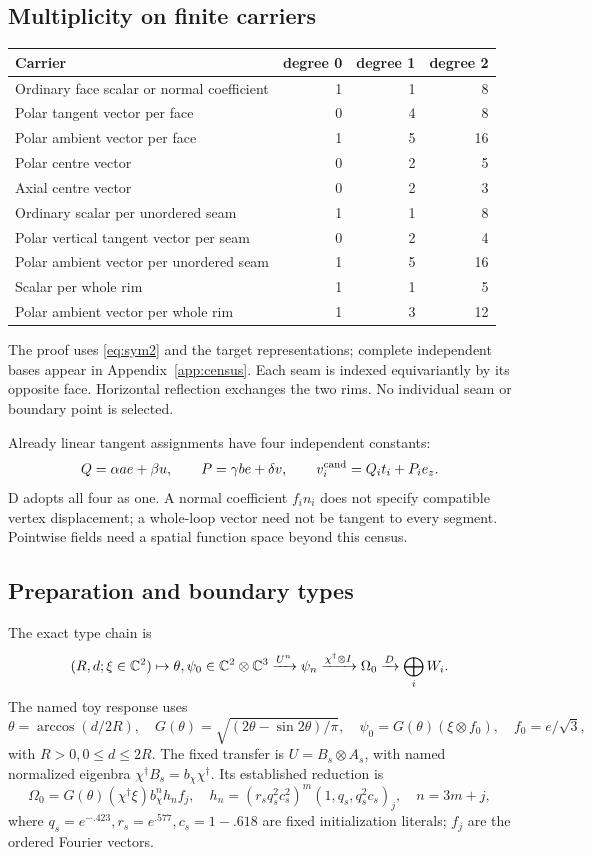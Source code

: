 \subsection{Multiplicity on finite carriers}
\begin{center}\small
\begin{tabular}{lrrr}\toprule
Carrier & degree 0 & degree 1 & degree 2\\\midrule
Ordinary face scalar or normal coefficient &1&1&8\\
Polar tangent vector per face &0&4&8\\
Polar ambient vector per face &1&5&16\\
Polar centre vector &0&2&5\\
Axial centre vector &0&2&3\\
Ordinary scalar per unordered seam &1&1&8\\
Polar vertical tangent vector per seam &0&2&4\\
Polar ambient vector per unordered seam &1&5&16\\
Scalar per whole rim &1&1&5\\
Polar ambient vector per whole rim &1&3&12\\\bottomrule
\end{tabular}
\end{center}
The proof uses \eqref{eq:sym2} and the target representations; complete independent bases appear in Appendix~\ref{app:census}. Each seam is indexed equivariantly by its opposite face. Horizontal reflection exchanges the two rims. No individual seam or boundary point is selected.

Already linear tangent assignments have four independent constants:
\[
Q=\alpha ae+\beta u,\qquad P=\gamma be+\delta v,\qquad
v_i^{\rm cand}=Q_it_i+P_ie_z.
\]
D adopts all four as one. A normal coefficient \(f_i n_i\) does not specify compatible vertex displacement; a whole-loop vector need not be tangent to every segment. Pointwise fields need a spatial function space beyond this census.

\subsection{Preparation and boundary types}
The exact type chain is
\begin{equation}
(R,d;\xi\in\mathbb C^2)\mapsto\theta,\psi_0\in\mathbb C^2\otimes\mathbb C^3
\xrightarrow{U^n}\psi_n\xrightarrow{\chi^\dagger\otimes I}\Omega_0
\xrightarrow{D}\bigoplus_iW_i.\label{eq:prep}
\end{equation}
The named toy response uses
\[
\theta=\arccos(d/2R),\quad
G(\theta)=\sqrt{(2\theta-\sin2\theta)/\pi},\quad
\psi_0=G(\theta)(\xi\otimes f_0),\quad f_0=e/\sqrt3,
\]
with \(R>0,0\le d\le2R\). The fixed transfer is \(U=B_s\otimes A_s\), with named normalized eigenbra \(\chi^\dagger B_s=b_\chi\chi^\dagger\). Its established reduction is
\[
\Omega_0=G(\theta)(\chi^\dagger\xi)b_\chi^n h_n f_j,\quad
h_n=(r_sq_s^2c_s^2)^m(1,q_s,q_s^2c_s)_j,\quad n=3m+j,
\]
where \(q_s=e^{-.423},r_s=e^{.577},c_s=1-.618\) are fixed initialization literals; \(f_j\) are the ordered Fourier vectors.

